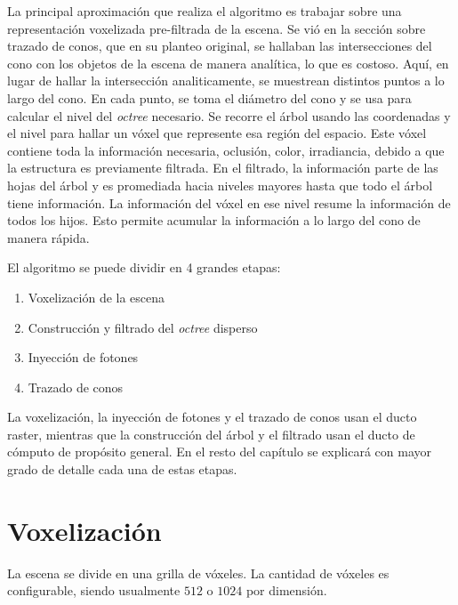 La principal aproximación que realiza el algoritmo es trabajar sobre una representación voxelizada pre-filtrada de la escena.
Se vió en la sección sobre trazado de conos, que en su planteo original, se hallaban las intersecciones del cono con los objetos de la escena de manera analítica, lo que es costoso.
Aquí, en lugar de hallar la intersección analiticamente, se muestrean distintos puntos a lo largo del cono.
En cada punto, se toma el diámetro del cono y se usa para calcular el nivel del \textit{octree} necesario.
Se recorre el árbol usando las coordenadas y el nivel para hallar un vóxel que represente esa región del espacio.
Este vóxel contiene toda la información necesaria, oclusión, color, irradiancia, debido a que la estructura es previamente filtrada.
En el filtrado, la información parte de las hojas del árbol y es promediada hacia niveles mayores hasta que todo el árbol tiene información.
La información del vóxel en ese nivel resume la información de todos los hijos.
Esto permite acumular la información a lo largo del cono de manera rápida.


El algoritmo se puede dividir en 4 grandes etapas:

\begin{enumerate}
    \item Voxelización de la escena
    \item Construcción y filtrado del \textit{octree} disperso
    \item Inyección de fotones
    \item Trazado de conos
\end{enumerate}

La voxelización, la inyección de fotones y el trazado de conos usan el ducto raster, mientras que la construcción del árbol y el filtrado usan el ducto de cómputo de propósito general.
En el resto del capítulo se explicará con mayor grado de detalle cada una de estas etapas.

\section{Voxelización}\label{sec:voxelization}

La escena se divide en una grilla de vóxeles.
La cantidad de vóxeles es configurable, siendo usualmente $512$ o $1024$ por dimensión.

